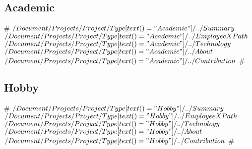 \documentclass[11pt,a4paper,sans]{moderncv}   %
\begin{document}
\subsection{Academic}
#
{$/Document/Projects/Project/Type[text()="Academic"]/../Summary$}
{$/Document/Projects/Project/Type[text()="Academic"]/../EmployeeXPath$}
{$/Document/Projects/Project/Type[text()="Academic"]/../Technology$}{}
{$/Document/Projects/Project/Type[text()="Academic"]/../About$\newline{}
$/Document/Projects/Project/Type[text()="Academic"]/../Contribution$}
#

\subsection{Hobby}
#
{$/Document/Projects/Project/Type[text()="Hobby"]/../Summary$}
{$/Document/Projects/Project/Type[text()="Hobby"]/../EmployeeXPath$}
{$/Document/Projects/Project/Type[text()="Hobby"]/../Technology$}{}
{$/Document/Projects/Project/Type[text()="Hobby"]/../About$\newline{}$/Document/Projects/Project/Type[text()="Hobby"]/../Contribution$}
#
\end{document}
